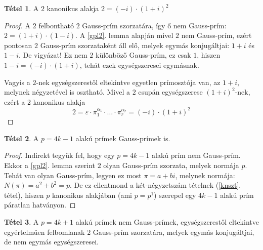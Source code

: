\documentclass[12pt]{book}
\theoremstyle{plain} %
\theoremstyle{definition} %
\newtheorem{theo/}{Tétel}[section]
\newenvironment{theo}
  {\renewcommand{\qedsymbol}{$\clubsuit$}%
   \pushQED{\qed}\begin{theo/}}
  {\popQED\end{theo/}}
\theoremstyle{remark}
\renewcommand\qedsymbol{$\blacksquare$}
\numberwithin{equation}{section}  %
\begin{document}
	\begin{theo}
		A $2$ kanonikus alakja $2=(-i)\cdot (1+i)^2$
	\end{theo}

	\begin{proof}
		A $2$ felbontható $2$ Gauss-prím szorzatára, így ő nem Gauss-prím: $2=(1+i)\cdot (1-i)$.
		A \ref{gpl2}. lemma alapján mivel $2$ nem Gauss-prím, ezért pontosan $2$ Gauss-prím szorzataként áll elő, melyek egymás konjugáltjai: $1+i$ és $1-i$. De vigyázat! Ez nem $2$ különböző Gauss-prím, ez csak $1$, hiszen $1-i = (-i) \cdot (1+i)$, tehát ezek egységszeresei egymásnak.
		
		Vagyis a $2$-nek egységszerestől eltekintve egyetlen prímosztója van, az $1+i$, melynek négyzetével is osztható. Mivel a $2$ csupán egységszerese $(1+i)^2$-nek, ezért a $2$ kanonikus alakja 
		\[ 2 = \varepsilon \cdot \pi_1^{\alpha_1} \cdot \ldots \cdot \pi_r^{\alpha_r} =  (-i)\cdot (1+i)^2 \]
	\end{proof}

	\begin{theo}
		A $p=4k-1$ alakú prímek Gauss-prímek is.
	\end{theo}

	\begin{proof}
		Indirekt tegyük fel, hogy egy $p=4k-1$ alakú prím nem Gauss-prím. Ekkor a \ref{gpl2}. lemma szerint $2$ olyan Gauss-prím szorzata, melyek normája $p$. Tehát van olyan Gauss-prím, legyen ez most $\pi = a+bi$, melynek normája: $N(\pi)= a^2 + b^2 = p$. De ez ellentmond a két-négyzetszám tételnek (\ref{knszt}. tétel), hiszen $p$ kanonikus alakjában (ami $p = p^1$) szerepel egy $4k-1$ alakú prím páratlan hatványon.
	\end{proof}
	
	\begin{theo}\label{4kp1}
		A $p=4k+1$ alakú prímek nem Gauss-prímek, egységszerestől eltekintve egyértelműen felbomlanak $2$ Gauss-prím szorzatára, melyek egymás konjugáltjai, de nem egymás egységszeresei.
	\end{theo}
\end{document}
